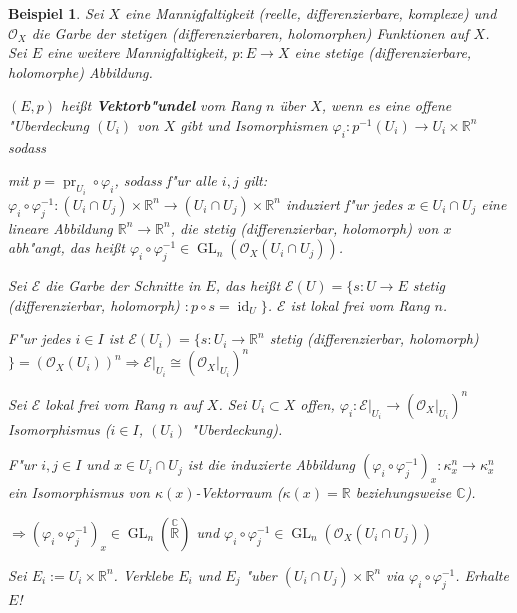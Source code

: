 \documentclass[paper = A4, fontsize=12pt, numbers=noendperiod, chapterprefix=true]{scrbook}
\theoremstyle{break}
\newtheorem{Bsp}[Def]{Beispiel}
\theoremstyle{nonumberbreak}
\theoremstyle{nonumberplain}
\newcommand{\emp}[1]{\textbf{\emph{#1}}}
\newcommand{\defterm}[1]{{\index{#1}}\emp{#1}}
\newcommand{\schraffiert}{\ensuremath{\nicefrac{\nicefrac{}{}}{\nicefrac{}{}}}}
\DeclareMathOperator{\id}{id}
\DeclareMathOperator{\pr}{pr}
\DeclareMathOperator{\GL}{GL}
\newcommand{\R}{\mathbb{R}}
\newcommand{\C}{\mathbb{C}}
\newcommand{\calE}{\mathcal{E}}
\newcommand{\calO}{\mathcal{O}}
\newcommand{\X}{\times}
\begin{document}
\begin{Bsp}\label{10.3}
Sei $X$ eine Mannigfaltigkeit (reelle, differenzierbare, komplexe) und $\calO_X$ die Garbe der stetigen (differenzierbaren, holomorphen) Funktionen auf $X$. Sei $E$ eine weitere Mannigfaltigkeit, $p: E \to X$ eine stetige (differenzierbare, holomorphe) Abbildung.

$(E,p)$ hei\ss t \defterm{Vektorb"undel} vom Rang $n$ \"uber $X$, wenn es eine offene "Uberdeckung $(U_i)$ von $X$ gibt und Isomorphismen $\varphi_i: p^{-1}(U_i) \to U_i \X \R^n$ sodass
	\begin{center}\end{center}
mit $p = \pr_{U_i} \circ \varphi_i$, sodass f"ur alle $i,j$ gilt: $\varphi_i \circ \varphi_j^{-1}: (U_i \cap U_j) \X \R^n \to (U_i \cap U_j) \X \R^n$ induziert f"ur jedes $x \in U_i \cap U_j$ eine lineare Abbildung $\R^n \to \R^n$, die stetig (differenzierbar, holomorph) von $x$ abh"angt, das hei\ss t $\varphi_i \circ \varphi_j^{-1} \in \GL_n (\calO_X(U_i \cap U_j))$.

Sei $\calE$ die Garbe der Schnitte in $E$, das hei\ss t $\calE(U) = \{ s: U \to E$ stetig (differenzierbar, holomorph) $: p \circ s = \id_U\}$. $\calE$ ist lokal frei vom Rang $n$.
\begin{description}[\setlabelstyle{\itshape}]
\item[Denn:]
	F"ur jedes $i \in I$ ist $\calE(U_i) = \{s: U_i \to \R^n$ stetig (differenzierbar, holomorph)$\} = (\calO_X(U_i))^n \Rightarrow \calE|_{U_i} \cong (\calO_X|_{U_i})^n$
\item[Umgekehrt:]
	Sei $\calE$ lokal frei vom Rang $n$ auf $X$. Sei $U_i \subset X$ offen, $\varphi_i: \calE|_{U_i} \to (\calO_X|_{U_i})^n$ Isomorphismus ($i \in I$, $(U_i)$ "Uberdeckung).
	
	F"ur $i,j \in I$ und $x \in U_i \cap U_j$ ist die induzierte Abbildung $(\varphi_i \circ \varphi_j^{-1})_x: \kappa_x^n \to \kappa_x^n$ ein Isomorphismus von $\kappa(x)$-Vektorraum ($\kappa(x) = \R$ beziehungsweise $\C$).
	
	$\Rightarrow (\varphi_i \circ \varphi_j^{-1})_x \in \GL_n(\overset{\C}{\R})$ und $\varphi_i \circ \varphi_j^{-1} \in \GL_n (\calO_X(U_i \cap U_j))$
	
	Sei $E_i := U_i \X \R^n$. Verklebe $E_i$ und $E_j$ "uber $(U_i \cap U_j) \X \R^n$ via $\varphi_i \circ \varphi_j^{-1}$. Erhalte $E$!
\end{description}\end{Bsp}
\end{document}
